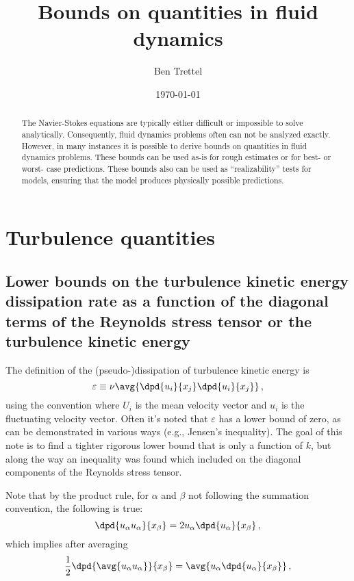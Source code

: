 \documentclass[ccbysa,note]{bmtreport}
\title{Bounds on quantities in fluid dynamics}
\author{Ben Trettel}
\date{\today} %
\begin{document}
\maketitle
\begin{abstract}
The Navier-Stokes equations are typically either difficult or impossible to solve analytically. Consequently, fluid dynamics problems often can not be analyzed exactly. However, in many instances it is possible to derive bounds on quantities in fluid dynamics problems. These bounds can be used as-is for rough estimates or for best- or worst- case predictions. These bounds also can be used as ``realizability'' tests for models, ensuring that the model produces physically possible predictions.
\end{abstract}

\section{Turbulence quantities}

\subsection{Lower bounds on the turbulence kinetic energy dissipation rate as a function of the diagonal terms of the Reynolds stress tensor or the turbulence kinetic energy}

The definition of the (pseudo-)dissipation of turbulence kinetic energy is
\begin{equation}
   \varepsilon \equiv \nu \avg{\dpd{u_i}{x_j} \dpd{u_i}{x_j}} \,,
\end{equation}
using the convention where $U_i$ is the mean velocity vector and $u_i$ is the fluctuating velocity vector. Often it's noted that $\varepsilon$ has a lower bound of zero, as can be demonstrated in various ways (e.g., Jensen's inequality). The goal of this note is to find a tighter rigorous lower bound that is only a function of $k$, but along the way an inequality was found which included on the diagonal components of the Reynolds stress tensor.

Note that by the product rule, for $\alpha$ and $\beta$ not following the summation convention, the following is true:
\begin{equation}
   \dpd{u_\alpha u_\alpha}{x_\beta} = 2 u_\alpha \dpd{u_\alpha}{x_\beta} \,, %
\end{equation}
which implies after averaging
\begin{equation}
   \frac{1}{2} \dpd{\avg{u_\alpha u_\alpha}}{x_\beta} = \avg{u_\alpha \dpd{u_\alpha}{x_\beta}} \,, \label{eq:diag to individual}
\end{equation}
\end{document}
